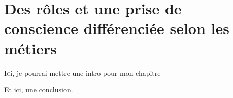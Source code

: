 \chapter[PDV métier]{\label{II-B}Des rôles et une prise de conscience différenciée selon les métiers }

\lettrine{I}ci, je pourrai mettre une intro pour mon chapitre




\bigskip
\bigskip
\bigskip

Et ici, une conclusion.